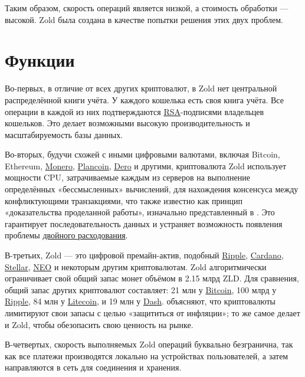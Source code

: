 \documentclass{main}
\begin{document}
Таким образом, скорость операций является низкой, а стоимость обработки ---
высокой. Zold была создана в качестве попытки решения этих двух проблем.

\pagebreak

\section*{Функции}

Во-первых, в отличие от всех других криптовалют, в Zold нет центральной
распределённой книги учёта. У каждого кошелька есть своя книга учёта. Все
операции в каждой из них подтверждаются
\href{https://ru.wikipedia.org/wiki/RSA}{RSA}-подпися\-ми владельцев кошельков. Это
делает возможными высокую производительность и масштабируемость базы данных.

Во-вторых, будучи схожей с иными цифровыми валютами, включая Bitcoin, Ethereum,
\href{https://getmonero.org/}{Monero}, \href{https://plancoin.co/}{Plancoin},
\href{https://dero.io/}{Dero} и другими, криптовалюта Zold использует мощности CPU, затрачиваемые
каждым из серверов на выполнение определённых «бессмысленных» вычислений,
для нахождения консен\-су\-са между конфликтующими транзакциями, что также
известно как принцип «доказательства проделанной работы», изначально представленный 
в \citeyear{back1997}. Это гарантирует последовательность данных и устраняет возможность
появления проблемы
\href{https://ru.wikipedia.org/wiki/%D0%94%D0%B2%D0%BE%D0%B9%D0%BD%D0%BE%D0%B5_%D1%80%D0%B0%D1%81%D1%85%D0%BE%D0%B4%D0%BE%D0%B2%D0%B0%D0%BD%D0%B8%D0%B5}{двойного расходования}.

В-третьих, Zold --- это цифровой премайн-актив, подобный \href{https://ripple.com/}{Rip\-ple},
\href{https://www.cardano.org/en/home/}{Car\-da\-no},
\href{https://www.stellar.org/}{Stellar},
\href{https://neo.org/}{NEO} и некоторым другим криптовалютам.
Zold алгоритмически ограничивает свой общий
запас монет объёмом в 2.15 млрд ZLD. Для сравнения, общий запас других
криптовалют составляет:
21 млн у \href{https://bitcoin.org/}{Bitcoin},
100 млрд у \href{https://ripple.com/}{Ripple},
84 млн у \href{https://litecoin.org/}{Litecoin},
и
19 млн у \href{https://www.dash.org/}{Dash}.
 объясняют, что криптовалюты лимитируют свои запасы с
целью «защититься от инфляции»; то же самое делает и Zold, чтобы обезопасить
свою ценность на рынке.

В-четвертых, скорость выполняемых Zold операций буквально безгранична, так как
все платежи производятся локально на устройствах пользователей, а затем
направляются в сеть для соединения и хранения.
\end{document}
